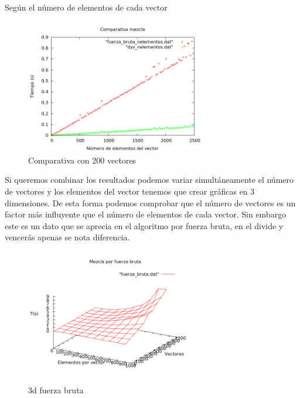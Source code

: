 \begin{frame}{Según el número de elementos de cada vector}
	\begin{block}
	
	\begin{figure}[htb] 
	\centering
	\includegraphics[width=0.7\textwidth]														{../Obligatorio/Graficas/comparativa_nelementos.png}
	\caption{Comparativa con 200 vectores} 
	\label{fig:comp_nelementos} 
\end{figure}
	\end{block}
\end{frame}


\begin{frame}
	\begin{block}
	
	Si queremos combinar los resultados podemos variar simult\'aneamente el n\'umero de 			vectores y los elementos del vector tenemos que crear gr\'aficas en $3$ dimensiones.
	De esta forma podemos comprobar que el n\'umero de vectores es un factor m\'as 				influyente que el n\'umero de elementos de cada vector. Sin embargo este es un dato 			que se aprecia en el algoritmo por fuerza bruta, en el divide y vencer\'as apenas se 			nota diferencia.
	\end{block}
\end{frame}

\begin{frame}
	\begin{block}
	
	\begin{figure}[htb] 
	\centering
	\includegraphics[width=0.7\textwidth]{../Obligatorio/Graficas/3d_fuerza_bruta.png}
	\caption{3d fuerza bruta} 
	\label{fig:3d_f} 
\end{figure}
	\end{block}
\end{frame}

